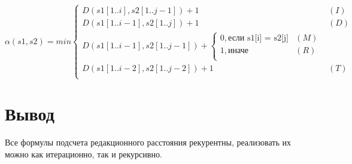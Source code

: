 \begin{equation}
	\alpha(s1, s2) = min 
	\begin{cases}
		D(s1[1..i], s2[1..j - 1]) + 1 & (I) \\
		D(s1[1..i - 1], s2[1..j]) + 1 & (D) \\
		D(s1[1..i - 1], s2[1..j - 1]) + 
		\begin{cases}
			0, \text{если s1[i] = s2[j]} & (M) \\
			1, \text{иначе} & (R) \\
		\end{cases}\\
		D(s1[1..i - 2], s2[1..j - 2]) + 1 & (T)\\
	\end{cases}
\end{equation}

\section{Вывод}

Все формулы подсчета редакционного расстояния рекурентны, реализовать их можно как итерационно, так и рекурсивно.
